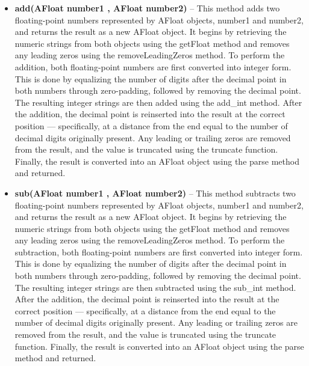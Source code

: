 \documentclass[a4paper,12pt]{article}
\begin{document}
\begin{itemize}
    \item \textbf{add(AFloat number1 , AFloat number2)} -- This method adds two floating-point numbers represented by AFloat objects, number1 and number2, and returns the result as a new AFloat object. It begins by retrieving the numeric strings from both objects using the getFloat method and removes any leading zeros using the removeLeadingZeros method. To perform the addition, both floating-point numbers are first converted into integer form. This is done by equalizing the number of digits after the decimal point in both numbers through zero-padding, followed by removing the decimal point. The resulting integer strings are then added using the add\_int method. After the addition, the decimal point is reinserted into the result at the correct position — specifically, at a distance from the end equal to the number of decimal digits originally present. Any leading or trailing zeros are removed from the result, and the value is truncated using the truncate function. Finally, the result is converted into an AFloat object using the parse method and returned.\\

    \item \textbf{sub(AFloat number1 , AFloat number2)} -- This method subtracts two floating-point numbers represented by AFloat objects, number1 and number2, and returns the result as a new AFloat object. It begins by retrieving the numeric strings from both objects using the getFloat method and removes any leading zeros using the removeLeadingZeros method. To perform the subtraction, both floating-point numbers are first converted into integer form. This is done by equalizing the number of digits after the decimal point in both numbers through zero-padding, followed by removing the decimal point. The resulting integer strings are then subtracted using the sub\_int method. After the addition, the decimal point is reinserted into the result at the correct position — specifically, at a distance from the end equal to the number of decimal digits originally present. Any leading or trailing zeros are removed from the result, and the value is truncated using the truncate function. Finally, the result is converted into an AFloat object using the parse method and returned.\\


\end{itemize}
\end{document}
